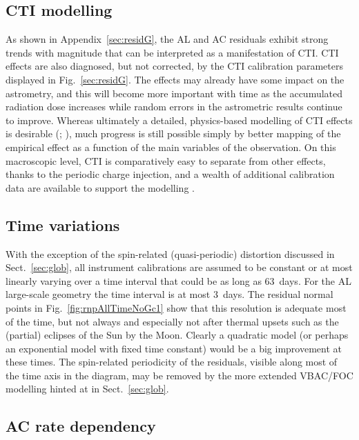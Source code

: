 \documentclass[longauth]{aa} %
\begin{document}
\subsection{CTI modelling}
 
As shown in Appendix~\ref{sec:residG}, the AL and AC residuals exhibit strong trends with
magnitude that can be interpreted as a manifestation of CTI. CTI effects are also diagnosed, 
but not corrected, by the CTI calibration parameters displayed in Fig.~\ref{sec:residG}.
The effects may already have some impact on the astrometry, and this will become more
important with time as the accumulated radiation dose increases while random errors
in the astrometric results continue to improve. Whereas ultimately a detailed, physics-based 
modelling of CTI effects is desirable (; ),
much progress is still possible simply by better mapping of the empirical effect as a function 
of the main variables of the observation. On this macroscopic level, CTI is comparatively easy 
to separate from other effects, thanks to the periodic charge injection, and a wealth of additional 
calibration data are available to support the modelling . 

\subsection{Time variations}

With the exception of the spin-related (quasi-periodic) distortion discussed in Sect.~\ref{sec:glob},
all instrument calibrations are assumed to be constant or at most linearly varying over a time interval
that could be as long as 63~days. For the AL large-scale geometry the time interval is at most 3~days.
The residual normal points in Fig.~\ref{fig:rnpAllTimeNoGc1} show that this resolution is adequate 
most of the time, but not always and especially not after thermal upsets such as the (partial) eclipses
of the Sun by the Moon. Clearly a quadratic model (or perhaps an exponential model with fixed 
time constant) 
would be a big improvement at these times. The spin-related periodicity of the residuals, visible 
along most of the time axis in the diagram, may be removed by the more extended VBAC/FOC 
modelling hinted at in Sect.~\ref{sec:glob}.

\subsection{AC rate dependency}
\label{sec:acRate}
\end{document}

